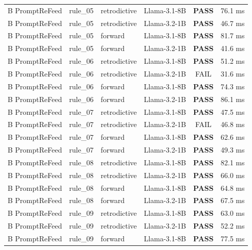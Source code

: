 {\begin{longtable}{p{2.2cm} p{1.2cm} p{2.0cm} p{3.8cm} c r}
B PromptReFeed & rule\_05 & retrodictive & Llama-3.1-8B & \textbf{\color{passgreen}PASS} & 76.1 ms \\
B PromptReFeed & rule\_05 & retrodictive & Llama-3.2-1B & \textbf{\color{passgreen}PASS} & 46.7 ms \\
B PromptReFeed & rule\_05 & forward & Llama-3.1-8B & \textbf{\color{passgreen}PASS} & 81.7 ms \\
B PromptReFeed & rule\_05 & forward & Llama-3.2-1B & \textbf{\color{passgreen}PASS} & 41.6 ms \\
B PromptReFeed & rule\_06 & retrodictive & Llama-3.1-8B & \textbf{\color{passgreen}PASS} & 51.2 ms \\
B PromptReFeed & rule\_06 & retrodictive & Llama-3.2-1B & \color{gray}FAIL & 31.6 ms \\
B PromptReFeed & rule\_06 & forward & Llama-3.1-8B & \textbf{\color{passgreen}PASS} & 74.3 ms \\
B PromptReFeed & rule\_06 & forward & Llama-3.2-1B & \textbf{\color{passgreen}PASS} & 86.1 ms \\
B PromptReFeed & rule\_07 & retrodictive & Llama-3.1-8B & \textbf{\color{passgreen}PASS} & 47.5 ms \\
B PromptReFeed & rule\_07 & retrodictive & Llama-3.2-1B & \color{gray}FAIL & 46.8 ms \\
B PromptReFeed & rule\_07 & forward & Llama-3.1-8B & \textbf{\color{passgreen}PASS} & 62.6 ms \\
B PromptReFeed & rule\_07 & forward & Llama-3.2-1B & \textbf{\color{passgreen}PASS} & 49.3 ms \\
B PromptReFeed & rule\_08 & retrodictive & Llama-3.1-8B & \textbf{\color{passgreen}PASS} & 82.1 ms \\
B PromptReFeed & rule\_08 & retrodictive & Llama-3.2-1B & \textbf{\color{passgreen}PASS} & 66.0 ms \\
B PromptReFeed & rule\_08 & forward & Llama-3.1-8B & \textbf{\color{passgreen}PASS} & 64.8 ms \\
B PromptReFeed & rule\_08 & forward & Llama-3.2-1B & \textbf{\color{passgreen}PASS} & 67.5 ms \\
B PromptReFeed & rule\_09 & retrodictive & Llama-3.1-8B & \textbf{\color{passgreen}PASS} & 63.0 ms \\
B PromptReFeed & rule\_09 & retrodictive & Llama-3.2-1B & \textbf{\color{passgreen}PASS} & 52.2 ms \\
B PromptReFeed & rule\_09 & forward & Llama-3.1-8B & \textbf{\color{passgreen}PASS} & 77.5 ms \\

\end{longtable}}
